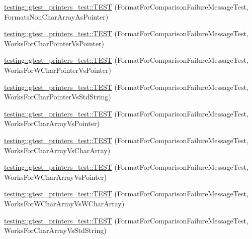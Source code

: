 \begin{DoxyCompactItemize}
\item 
\hyperlink{namespacetesting_1_1gtest__printers__test_a3571808f93f419268b6aed1aa127ea30}{testing\+::gtest\+\_\+printers\+\_\+test\+::\+T\+E\+S\+T} (Format\+For\+Comparison\+Failure\+Message\+Test, Formats\+Non\+Char\+Array\+As\+Pointer)
\item 
\hyperlink{namespacetesting_1_1gtest__printers__test_a1694d4063da702f5379495d3cb2cbc91}{testing\+::gtest\+\_\+printers\+\_\+test\+::\+T\+E\+S\+T} (Format\+For\+Comparison\+Failure\+Message\+Test, Works\+For\+Char\+Pointer\+Vs\+Pointer)
\item 
\hyperlink{namespacetesting_1_1gtest__printers__test_a735171f4ba0a9dffee9c4c7321107822}{testing\+::gtest\+\_\+printers\+\_\+test\+::\+T\+E\+S\+T} (Format\+For\+Comparison\+Failure\+Message\+Test, Works\+For\+W\+Char\+Pointer\+Vs\+Pointer)
\item 
\hyperlink{namespacetesting_1_1gtest__printers__test_ab5a910170489276c14b817b70d4feb96}{testing\+::gtest\+\_\+printers\+\_\+test\+::\+T\+E\+S\+T} (Format\+For\+Comparison\+Failure\+Message\+Test, Works\+For\+Char\+Pointer\+Vs\+Std\+String)
\item 
\hyperlink{namespacetesting_1_1gtest__printers__test_ac25834e0463cf9f3d231db24e7b220e5}{testing\+::gtest\+\_\+printers\+\_\+test\+::\+T\+E\+S\+T} (Format\+For\+Comparison\+Failure\+Message\+Test, Works\+For\+Char\+Array\+Vs\+Pointer)
\item 
\hyperlink{namespacetesting_1_1gtest__printers__test_aba32640344f0186de5fbb6bb47e0c5a5}{testing\+::gtest\+\_\+printers\+\_\+test\+::\+T\+E\+S\+T} (Format\+For\+Comparison\+Failure\+Message\+Test, Works\+For\+Char\+Array\+Vs\+Char\+Array)
\item 
\hyperlink{namespacetesting_1_1gtest__printers__test_a1e95289500400eff5fdcd45c5864a6d2}{testing\+::gtest\+\_\+printers\+\_\+test\+::\+T\+E\+S\+T} (Format\+For\+Comparison\+Failure\+Message\+Test, Works\+For\+W\+Char\+Array\+Vs\+Pointer)
\item 
\hyperlink{namespacetesting_1_1gtest__printers__test_af4b502fb5745d2ee0bfb81d1c8eb95f6}{testing\+::gtest\+\_\+printers\+\_\+test\+::\+T\+E\+S\+T} (Format\+For\+Comparison\+Failure\+Message\+Test, Works\+For\+W\+Char\+Array\+Vs\+W\+Char\+Array)
\item 
\hyperlink{namespacetesting_1_1gtest__printers__test_ac2300073f401f783ff7b1ef97d2cbd6d}{testing\+::gtest\+\_\+printers\+\_\+test\+::\+T\+E\+S\+T} (Format\+For\+Comparison\+Failure\+Message\+Test, Works\+For\+Char\+Array\+Vs\+Std\+String)
\item 

\end{DoxyCompactItemize}
